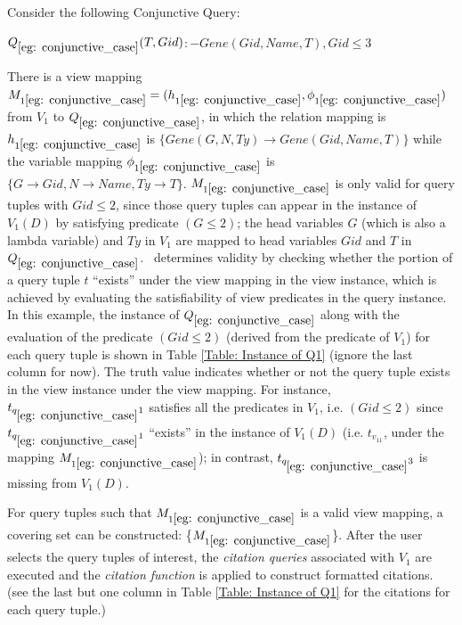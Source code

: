 \begin{example}\label{eg: conjunctive_case}
Consider the following Conjunctive Query:
\begin{tabbing}
$Q_{\ref{eg: conjunctive_case}}(T, Gid) $\hspace{0.05em}$:- Gene(Gid, Name, T), Gid \leq 3$
\end{tabbing}
There is a view mapping $M_{1\ref{eg: conjunctive_case}} = (h_{1\ref{eg: conjunctive_case}}, \phi_{1\ref{eg: conjunctive_case}})$ from $V_1$ to $Q_{\ref{eg: conjunctive_case}}$, in which the relation mapping is $h_{1\ref{eg: conjunctive_case}}$ is $\{Gene(G, N, Ty) \rightarrow Gene(Gid, Name, T)\}$ while the variable mapping $\phi_{1\ref{eg: conjunctive_case}}$ is \\$\{G\rightarrow Gid, N \rightarrow Name, Ty\rightarrow T\}$. $M_{1\ref{eg: conjunctive_case}}$ is only valid for query tuples with $Gid \leq 2$, since those query tuples can appear in the instance of  $V_1(D)$ by satisfying predicate $(G \leq 2)$; the head variables $G$ (which is also a lambda variable) and $Ty$ in $V_1$ are mapped to head variables $Gid$ and $T$ in $Q_{\ref{eg: conjunctive_case}}$. \rba\ determines validity by checking whether the portion of a query tuple $t$ ``exists'' under the view mapping in the view instance, which is achieved by evaluating the satisfiability of view predicates in the query instance. In this example, the instance of $Q_{\ref{eg: conjunctive_case}}$ along with the evaluation of the predicate $(Gid \leq 2)$ (derived from the predicate of $V_1$) for each query tuple is shown in Table \ref{Table: Instance of Q1} (ignore the last column for now). The truth value indicates whether or not the query tuple exists in the view instance under the view mapping. For instance, $t_{q_{\ref{eg: conjunctive_case}}1}$ satisfies all the predicates in $V_1$, i.e. $(Gid \leq 2)$ since $t_{q_{\ref{eg: conjunctive_case}}1}$ ``exists'' in the instance of $V_1(D)$ (i.e. $t_{v_11}$, under the mapping $M_{1\ref{eg: conjunctive_case}}$); in contrast, $t_{q_{\ref{eg: conjunctive_case}}3}$ is missing from $V_1(D)$.

For query tuples such that $M_{1\ref{eg: conjunctive_case}}$ is a valid view mapping, a covering set can be constructed:  \{$M_{1\ref{eg: conjunctive_case}}$\}. After the user selects the query tuples of interest, the \textit{citation queries} associated with $V_1$ are executed and the {\em citation function} is applied to construct formatted citations. 
(see the last but one column in Table \ref{Table: Instance of Q1} for the citations for each query tuple.)
\end{example}

